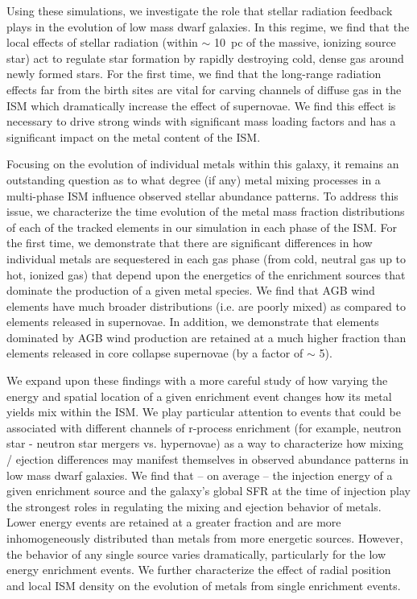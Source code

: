 Using these simulations, we investigate the role that stellar radiation feedback plays in the evolution of low mass dwarf galaxies. In this regime, we find that the local effects of stellar radiation (within $\sim$ 10~pc of the massive, ionizing source star) act to regulate star formation by rapidly destroying cold, dense gas around newly formed stars. For the first time, we find that the long-range radiation effects far from the birth sites are vital for carving channels of diffuse gas in the ISM which dramatically increase the effect of supernovae. We find this effect is necessary to drive strong winds with significant mass loading factors and has a significant impact on the metal content of the ISM.

Focusing on the evolution of individual metals within this galaxy, it remains an outstanding question as to what degree (if any) metal mixing processes in a multi-phase ISM influence observed stellar abundance patterns. To address this issue, we characterize the time evolution of the metal mass fraction distributions of each of the tracked elements in our simulation in each phase of the ISM. For the first time, we demonstrate that there are significant differences in how individual metals are sequestered in each gas phase (from cold, neutral gas up to hot, ionized gas) that depend upon the energetics of the enrichment sources that dominate the production of a given metal species. We find that AGB wind elements have much broader distributions (i.e. are poorly mixed) as compared to elements released in supernovae. In addition, we demonstrate that elements dominated by AGB wind production are retained at a much higher fraction than elements released in core collapse supernovae (by a factor of $\sim$ 5).

We expand upon these findings with a more careful study of how varying the energy and spatial location of a given enrichment event changes how its metal yields mix within the ISM. We play particular attention to events that could be associated with different channels of r-process enrichment (for example, neutron star - neutron star mergers vs. hypernovae) as a way to characterize how mixing / ejection differences may manifest themselves in observed abundance patterns in low mass dwarf galaxies. We find that -- on average -- the injection energy of a given enrichment source and the galaxy's global SFR at the time of injection play the strongest roles in regulating the mixing and ejection behavior of metals. Lower energy events are retained at a greater fraction and are more inhomogeneously distributed than metals from more energetic sources. However, the behavior of any single source varies dramatically, particularly for the low energy enrichment events. We further characterize the
effect of radial position and local ISM density on the evolution of metals from single enrichment events.


